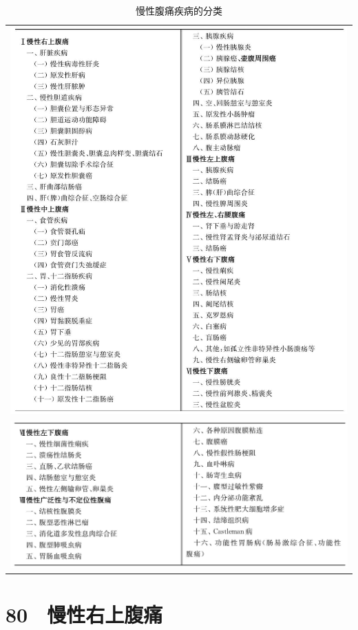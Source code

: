 \begin{longtable}{c}
 \caption{慢性腹痛疾病的分类}
 \label{tab26-1}
 \endfirsthead
 \caption[]{慢性腹痛疾病的分类}
 \endhead
 \includegraphics[width=\textwidth,height=\textheight,keepaspectratio]{./images/Image00147.jpg}\\
 \includegraphics[width=\textwidth,height=\textheight,keepaspectratio]{./images/Image00148.jpg}
 \end{longtable}

\protect\hypertarget{text00203.html}{}{}

\section{80　慢性右上腹痛}

